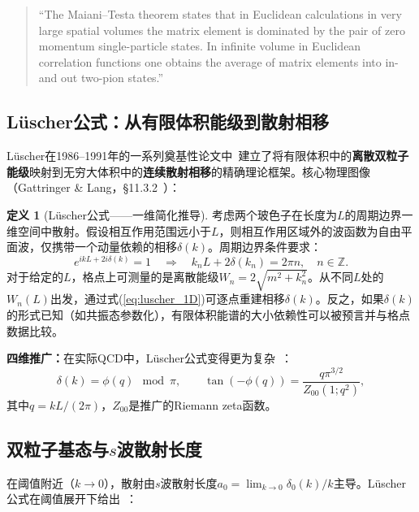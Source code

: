 \documentclass[12pt,a4paper]{ctexart}
\theoremstyle{definition}
\newtheorem{definition}{定义}[section]
\begin{document}
\begin{quote}
``The Maiani--Testa theorem states that in Euclidean calculations in very large spatial volumes the matrix element is dominated by the pair of zero momentum single-particle states. In infinite volume in Euclidean correlation functions one obtains the average of matrix elements into in- and out two-pion states.''~\cite{GattringerLang2010}
\end{quote}

\subsection{L\"uscher公式：从有限体积能级到散射相移}

L\"uscher在1986--1991年的一系列奠基性论文中~\cite{Luscher1986}建立了将有限体积中的\textbf{离散双粒子能级}映射到无穷大体积中的\textbf{连续散射相移}的精确理论框架。核心物理图像（Gattringer \& Lang，§11.3.2~\cite{GattringerLang2010}）：

\begin{definition}[L\"uscher公式——一维简化推导]
考虑两个玻色子在长度为$L$的周期边界一维空间中散射。假设相互作用范围远小于$L$，则相互作用区域外的波函数为自由平面波，仅携带一个动量依赖的相移$\delta(k)$。周期边界条件要求：
\begin{equation}
e^{i k L + 2i\delta(k)} = 1 \quad\Longrightarrow\quad k_n L + 2\delta(k_n) = 2\pi n, \quad n\in\mathbb{Z}.
\label{eq:luscher_1D}
\end{equation}
对于给定的$L$，格点上可测量的是离散能级$W_n = 2\sqrt{m^2 + k_n^2}$。从不同$L$处的$W_n(L)$出发，通过式(\ref{eq:luscher_1D})可逐点重建相移$\delta(k)$。反之，如果$\delta(k)$的形式已知（如共振态参数化），有限体积能谱的大小依赖性可以被预言并与格点数据比较。
\end{definition}

\textbf{四维推广：}在实际QCD中，L\"uscher公式变得更为复杂~\cite{GattringerLang2010}：
\begin{equation}
\boxed{\delta(k) = \phi(q) \!\! \mod \pi, \qquad \tan(-\phi(q)) = \frac{q\pi^{3/2}}{Z_{00}(1; q^2)},}
\label{eq:luscher_4D}
\end{equation}
其中$q = kL/(2\pi)$，$Z_{00}$是推广的Riemann zeta函数。

\subsection{双粒子基态与$s$波散射长度$^{}$}

在阈值附近（$k\to 0$），散射由$s$波散射长度$a_0 = \lim_{k\to 0}\delta_0(k)/k$主导。L\"uscher公式在阈值展开下给出~\cite{GattringerLang2010}：
\end{document}
